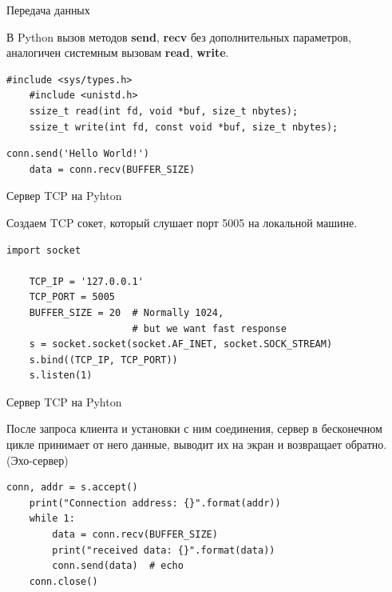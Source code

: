 \begin{frame}[fragile]{Передача данных}

    В Python вызов методов \textbf{send}, \textbf{recv} без дополнительных
    параметров, аналогичен системным вызовам \textbf{read}, \textbf{write}.

    \begin{lstlisting}[style=cpp, caption=Си]
    #include <sys/types.h>
    #include <unistd.h>
    ssize_t read(int fd, void *buf, size_t nbytes);
    ssize_t write(int fd, const void *buf, size_t nbytes);
    \end{lstlisting}

    \begin{lstlisting}[style=python, caption=Python]
    conn.send('Hello World!')
    data = conn.recv(BUFFER_SIZE)
    \end{lstlisting}
\end{frame}

\begin{frame}[fragile]{Сервер TCP на Pyhton}

    Создаем TCP сокет, который слушает порт 5005 на локальной машине.

    \begin{lstlisting}[style=python, caption=Python]
    import socket

    TCP_IP = '127.0.0.1'
    TCP_PORT = 5005
    BUFFER_SIZE = 20  # Normally 1024,
                      # but we want fast response
    s = socket.socket(socket.AF_INET, socket.SOCK_STREAM)
    s.bind((TCP_IP, TCP_PORT))
    s.listen(1)
    \end{lstlisting}
\end{frame}

\begin{frame}[fragile]{Сервер TCP на Pyhton}

    После запроса клиента и установки с ним соединения, сервер в бесконечном
    цикле принимает от него данные, выводит их на экран и возвращает обратно.
    (Эхо-сервер)

    \begin{lstlisting}[style=python, caption=Python]
    conn, addr = s.accept()
    print("Connection address: {}".format(addr))
    while 1:
        data = conn.recv(BUFFER_SIZE)
        print("received data: {}".format(data))
        conn.send(data)  # echo
    conn.close()
    \end{lstlisting}
\end{frame}

